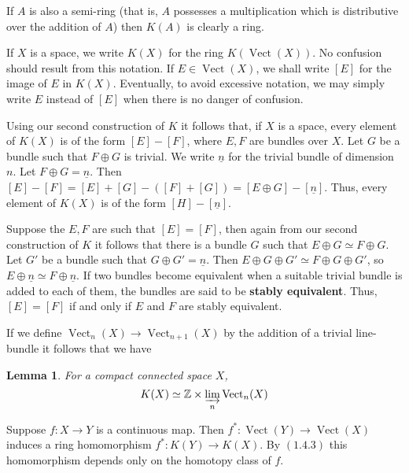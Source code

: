 \documentclass[leqno]{book}
\numberwithin{equation}{section}
\newtheorem{lemma}[theorem]{Lemma}
\theoremstyle{definition}
\renewcommand{\emph}{\textbf}
\begin{document}
            If $A$ is also a semi-ring (that is, $A$ possesses a multiplication which is distributive over the addition of $A$) then $K(A)$ is clearly a ring.

            If $X$ is a space, we write $K(X)$ for the ring $K(\operatorname{Vect}(X))$. No confusion should result from this notation. If $E\in \operatorname{Vect}(X)$, we shall write $[E]$ for the image of $E$ in $K(X)$. Eventually, to avoid excessive notation, we may simply write $E$ instead of $[E]$ when there is no danger of confusion.

            Using our second construction of $K$ it follows that, if $X$ is a space, every element of $K(X)$ is of the form $[E]-[F]$, where $E,F$ are bundles over $X$. Let $G$ be a bundle such that $F \oplus G$ is trivial. We write $\underline{n}$ for the trivial bundle of dimension $n$. Let $F \oplus G = \underline{n}$. Then $[E]-[F]=[E]+[G]-([F]+[G])=[E\oplus G]-[\underline{n}]$. Thus, every element of $K(X)$ is of the form $[H]-[\underline{n}]$.

            Suppose the $E,F$ are such that $[E]=[F]$, then again from our second construction of $K$ it follows that there is a bundle $G$ such that $E\oplus G\simeq F\oplus G$. Let $G'$ be a bundle such that $G\oplus G'=\underline{n}$. Then $E\oplus G\oplus G'\simeq F\oplus G\oplus G'$, so $E\oplus \underline{n}\simeq F\oplus \underline{n}$. If two bundles become equivalent when a suitable trivial bundle is added to each of them, the bundles are said to be \emph{stably equivalent}. Thus, $[E]=[F]$ if and only if $E$ and $F$ are stably equivalent.

            If we define $\operatorname{Vect}_{n}(X)\to \operatorname{Vect}_{n+1}(X)$ by the addition of a trivial line-bundle it follows that we have
            \begin{lemma}
                For a compact connected space $X$,
                \begin{equation*}
                  K(X)\simeq \mathbb{Z}\times \varinjlim_{n} \operatorname{Vect}_{n}(X)
                \end{equation*}
            \end{lemma}

            Suppose $f:X\to Y$ is a continuous map. Then $f^{*}:\operatorname{Vect}(Y)\to \operatorname{Vect}(X)$ induces a ring homomorphism $f^{*}:K(Y)\to K(X)$. By $(1.4.3)$ this homomorphism depends only on the homotopy class of $f$.
\end{document}
